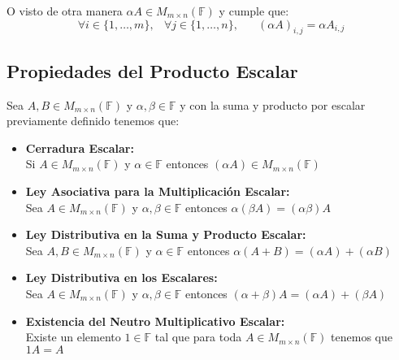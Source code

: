 \documentclass[12pt]{report}                                    %
\DeclareMathOperator \Space {\quad}                             %
\DeclareMathOperator \MiniSpace {\;}                            %
\begin{document}
            O visto de otra manera $\alpha A \in M_{m \times n}(\mathbb{F})$ y cumple que:
            \begin{equation}
                \forall i \in \{1, \dots, m\} ,\MiniSpace
                    \forall j \in \{1, \dots, n\} ,\Space
                        (\alpha A)_{i, j} = \alpha A_{i, j}
            \end{equation}

            \subsection{Propiedades del Producto Escalar}

                Sea $A, B \in M_{m \times n}(\mathbb{F})$ y $\alpha, \beta \in \mathbb{F}$
                y con la suma y producto por escalar previamente definido tenemos que:

                \begin{itemize}

                    \item \textbf{Cerradura Escalar:}\\
                        Si $A\in M_{m \times n}(\mathbb{F})$ y $\alpha \in \mathbb{F}$ entonces 
                        $(\alpha A) \in M_{m \times n}(\mathbb{F})$

                    \item \textbf{Ley Asociativa para la Multiplicación Escalar:}\\
                        Sea $A \in M_{m \times n}(\mathbb{F})$ y $\alpha, \beta \in \mathbb{F}$
                        entonces $\alpha(\beta A) = (\alpha \beta)A$

                    \item \textbf{Ley Distributiva en la Suma y Producto Escalar:}\\
                        Sea $A, B \in M_{m \times n}(\mathbb{F})$ y $\alpha \in \mathbb{F}$
                        entonces $\alpha(A + B) = (\alpha A) + (\alpha B)$

                    \item \textbf{Ley Distributiva en los Escalares:}\\
                        Sea $A \in M_{m \times n}(\mathbb{F})$ y $\alpha, \beta \in \mathbb{F}$
                        entonces $(\alpha + \beta)A = (\alpha A) + (\beta A)$

                    \item \textbf{Existencia del Neutro Multiplicativo Escalar:}\\
                        Existe un elemento $1 \in \mathbb{F}$ tal que para toda
                            $A \in M_{m \times n}(\mathbb{F})$ tenemos que $1A = A$

                \end{itemize}
\end{document}
